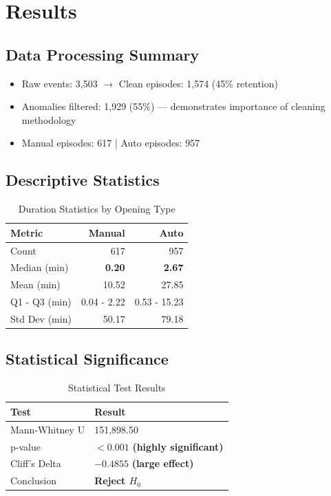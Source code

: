 \documentclass[11pt,a4paper]{article}
\begin{document}
\section{Results}

\subsection{Data Processing Summary}
\begin{itemize}
    \item Raw events: 3,503 $\rightarrow$ Clean episodes: 1,574 (45\% retention)
    \item Anomalies filtered: 1,929 (55\%) — demonstrates importance of cleaning methodology
    \item Manual episodes: 617 | Auto episodes: 957
\end{itemize}

\subsection{Descriptive Statistics}

\begin{table}[H]
\centering
\begin{tabular}{@{}lrr@{}}
\toprule
\textbf{Metric} & \textbf{Manual} & \textbf{Auto} \\
\midrule
Count & 617 & 957 \\
Median (min) & \textbf{0.20} & \textbf{2.67} \\
Mean (min) & 10.52 & 27.85 \\
Q1 - Q3 (min) & 0.04 - 2.22 & 0.53 - 15.23 \\
Std Dev (min) & 50.17 & 79.18 \\
\bottomrule
\end{tabular}
\caption{Duration Statistics by Opening Type}
\end{table}

\subsection{Statistical Significance}

\begin{table}[H]
\centering
\begin{tabular}{@{}ll@{}}
\toprule
\textbf{Test} & \textbf{Result} \\
\midrule
Mann-Whitney U & 151,898.50 \\
p-value & $< 0.001$ \textbf{(highly significant)} \\
Cliff's Delta & $-0.4855$ \textbf{(large effect)} \\
Conclusion & \textbf{Reject $H_0$} \\
\bottomrule
\end{tabular}
\caption{Statistical Test Results}
\end{table}
\end{document}
